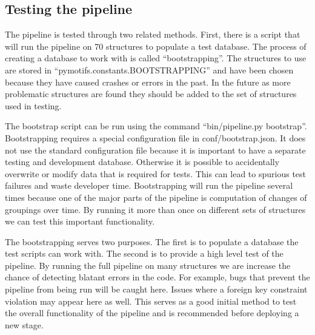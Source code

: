 \subsection{Testing the pipeline}

The pipeline is tested through two related methods. First, there is a script
that will run the pipeline on 70 structures to populate a test database. The
process of creating a database to work with is called ``bootstrapping''. The
structures to use are stored in ``pymotifs.constants.BOOTSTRAPPING'' and have been
chosen because they have caused crashes or errors in the past. In the future as
more problematic structures are found they should be added to the set of
structures used in testing.

The bootstrap script can be run using the command ``bin/pipeline.py bootstrap''.
Bootstrapping requires a special configuration file in conf/bootstrap.json. It
does not use the standard configuration file because it is important to have a
separate testing and development database. Otherwise it is possible to
accidentally overwrite or modify data that is required for tests. This can lead
to spurious test failures and waste developer time. Bootstrapping will run the
pipeline several times because one of the major parts of the pipeline is
computation of changes of groupings over time. By running it more than once on
different sets of structures we can test this important functionality.

The bootstrapping serves two purposes. The first is to populate a database the
test scripts can work with. The second is to provide a high level test of the
pipeline. By running the full pipeline on many structures we are increase the
chance of detecting blatant errors in the code. For example, bugs that prevent
the pipeline from being run will be caught here. Issues where a foreign key
constraint violation may appear here as well. This serves as a good initial
method to test the overall functionality of the pipeline and is recommended
before deploying a new stage.

